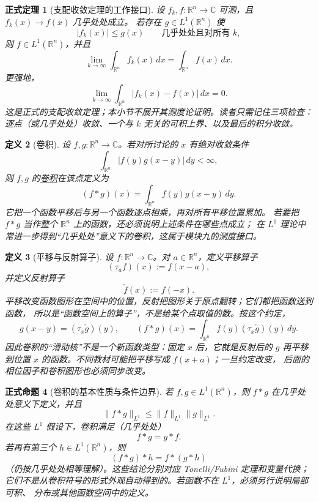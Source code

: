 \documentclass[UTF8,fontset=none,a4paper,11pt]{ctexart}
\theoremstyle{foundation-definition}
\newtheorem{definition}{定义}[section]
\theoremstyle{foundation-theorem}
\newtheorem{theorem}[definition]{正式定理}
\theoremstyle{foundation-proposition}
\newtheorem{proposition}[definition]{正式命题}
\theoremstyle{foundation-example}
\theoremstyle{foundation-remark}
\theoremstyle{foundation-theorem}
\newcommand{\term}[2]{\hyperref[#1]{#2}}
\begin{document}
\begin{theorem}[支配收敛定理的工作接口]\label{thm:dominated-convergence-interface}
设 \(f_k,f:\mathbb R^n\to\mathbb C\) 可测，且 \(f_k(x)\to f(x)\) 几乎处处成立。
若存在 \(g\in L^1(\mathbb R^n)\) 使
\[
|f_k(x)|\leq g(x)\qquad\text{几乎处处且对所有 }k,
\]
则 \(f\in L^1(\mathbb R^n)\)，并且
\[
\lim_{k\to\infty}\int_{\mathbb R^n}f_k(x)\,dx
=\int_{\mathbb R^n}f(x)\,dx.
\]
更强地，
\[
\lim_{k\to\infty}\int_{\mathbb R^n}|f_k(x)-f(x)|\,dx=0.
\]
这是正式的支配收敛定理；本小节不展开其测度论证明。读者只需记住三项检查：
逐点（或几乎处处）收敛、一个与 \(k\) 无关的可积上界、以及最后的积分收敛。
\end{theorem}

\begin{definition}[卷积]\label{def:convolution}
设 \(f,g:\mathbb R^n\to\mathbb C\)。若对所讨论的 \(x\) 有绝对收敛条件
\[
  \int_{\mathbb R^n}|f(y)g(x-y)|\,dy<\infty,
\]
则 \(f,g\) 的\term{def:convolution}{卷积}在该点定义为
\[
(f*g)(x)=\int_{\mathbb R^n}f(y)g(x-y)\,dy.
\]
它把一个函数平移后与另一个函数逐点相乘，再对所有平移位置累加。
若要把 \(f*g\) 当作整个 \(\mathbb R^n\) 上的函数，还必须说明上述条件在哪些点成立；
在 \(L^1\) 理论中常进一步得到“几乎处处”意义下的卷积，这属于模块九的测度接口。
\end{definition}

\begin{definition}[平移与反射算子]\label{def:translation-reflection}
设 \(f:\mathbb R^n\to\mathbb C\)。对 \(a\in\mathbb R^n\)，定义平移算子
\[
(\tau_a f)(x):=f(x-a),
\]
并定义反射算子
\[
\check f(x):=f(-x).
\]
平移改变函数图形在空间中的位置，反射把图形关于原点翻转；它们都把函数送到函数，
所以是“函数空间上的算子”，不是给某个点取值的数。按这个约定，
\[
g(x-y)=(\tau_x\check g)(y),
\qquad
(f*g)(x)=\int_{\mathbb R^n}f(y)(\tau_x\check g)(y)\,dy.
\]
因此卷积的“滑动核”不是一个新函数类型：固定 \(x\) 后，它就是反射后的 \(g\)
再平移到位置 \(x\) 的函数。不同教材可能把平移写成 \(f(x+a)\)；一旦约定改变，
后面的相位因子和卷积图形也必须同步改变。
\end{definition}

\begin{proposition}[卷积的基本性质与条件边界]\label{prop:convolution-basic}
若 \(f,g\in L^1(\mathbb R^n)\)，则 \(f*g\) 在几乎处处意义下定义，并且
\[
\|f*g\|_{L^1}\leq \|f\|_{L^1}\|g\|_{L^1}.
\]
在这些 \(L^1\) 假设下，卷积满足（几乎处处）
\[
f*g=g*f.
\]
若再有第三个 \(h\in L^1(\mathbb R^n)\)，则
\[
(f*g)*h=f*(g*h)
\]
（仍按几乎处处相等理解）。这些结论分别对应 Tonelli/Fubini 定理和变量代换；
它们不是从卷积符号的形式外观自动得到的。若函数不在 \(L^1\)，必须另行说明局部可积、
分布或其他函数空间中的定义。
\end{proposition}
\end{document}
